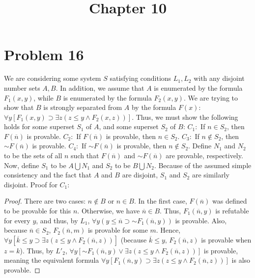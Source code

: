 \documentclass{article}
\title{Chapter 10}
\newcommand*{\oldneg}{\mathord{\sim}}
\theoremstyle{definition}
\begin{document}
\maketitle

\section*{Problem 16}

We are considering some system $S$ satisfying conditions $L_1, L_2$ with any disjoint number sets $A, B$. In addition, we assume that
$A$ is enumerated by the formula $F_1(x, y)$, while $B$ is enumerated by the formula $F_2(x, y)$. We are trying to show that $B$ is strongly separated from
$A$ by the formula $F(x)$:\newline
$\forall y[F_1(x, y) \supset \exists z(z \le y \wedge F_2(x, z))]$.\newline
Thus, we must show the following holds for some superset $S_1$ of $A$, and some superset $S_2$ of $B$:\newline
\quad$C_1:$ If $n\in S_2$, then $F(\overline n)$ is provable.\newline
\quad$C_2:$ If $F(\overline n)$ is provable, then $n\in S_2$.\newline
\quad$C_3:$ If $n\notin S_2$, then $\oldneg F(\overline n)$ is provable.\newline
\quad$C_4:$ If $\oldneg F(\overline n)$ is provable, then $n\notin S_2$.\newline
Define $N_1$ and $N_2$ to be the sets of all $n$ such that $F(\overline n)$ and $\oldneg F(\overline n)$ are provable, respectively. Now, define $S_1$ to be
$A \bigcup N_1$ and $S_2$ to be $B \bigcup N_2$. Because of the assumed simple consistency and the fact that $A$ and $B$ are disjoint, $S_1$ and $S_2$
are similarly disjoint.\newline
Proof for $C_1$:
\begin{proof}
There are two cases: $n\notin B$ or $n\in B$. In the first case, $F(\overline n)$ was defined to be provable for this $n$. Otherwise, we have
$\overline n\in B$. Thus, $F_1(\overline n, y)$ is refutable for every $y$, and thus, by $L_1$, 
$\forall y(y \le \overline n\supset \oldneg F_1(\overline n, y))$ is provable. Also, because $\overline n\in S_2$, 
$F_2(\overline n, m)$ is provable for some $m$. Hence, $\forall y[\overline k \le y \supset \exists z(z \le y \wedge F_2(\overline n, z))]$ 
(because $\overline k\le y$, $F_2(\overline n, z)$ is provable when $z = k$).
Thus, by $L' _2$, $\forall y[\oldneg F_1(\overline n, y) \vee \exists z(z \le y \wedge F_2(\overline n, z))]$ is provable, meaning the equivalent
formula $\forall y[F_1(\overline n, y) \supset \exists z(z \le y \wedge F_2(\overline n, z))]$ is also provable.
\end{proof}
\end{document}
